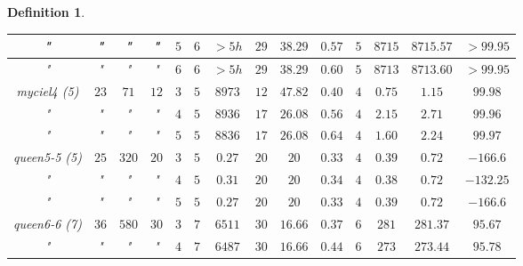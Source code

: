 \documentclass[12pt]{article}
\theoremstyle{slplain}
\newtheorem{defi}{Definition}
\begin{document}
\begin{defi}
\begin{table}[H]
\begin{center}
\begin{tabular}{|c|c|c|c|c|c|c|c|c|c|c|c|c|c|}
\hline
{\small "} & {\small "} & {\small "} & {\small "} & {\small $5$} & {\small $6$} & {\small $>5h$} & {\small $29$}  & {\small $38.29$} & {\small $0.57$}  & {\small $5$} & {\small $8715$} & {\small $8715.57$}  & {\small $>99.95$}\\
\hline
{\small "} & {\small "} & {\small "} & {\small "} & {\small $6$} & {\small $6$} & {\small $>5h$} & {\small $29$}  & {\small $38.29$} & {\small $0.60$} & {\small $5$} & {\small $8713$} & {\small $8713.60$}  & {\small $>99.95$}\\
\hline
\hline
{\small myciel4 (5)} & {\small $23$} & {\small $71$} & {\small $12$} & {\small $3$} & {\small $5$} & {\small $8973$} & {\small $12$}  & {\small $47.82$} & {\small $0.40$} & {\small $4$} & {\small $0.75$} & {\small $1.15$}  & {\small $99.98$}\\
\hline
{\small "} & {\small "} & {\small "} & {\small "} & {\small $4$} & {\small $5$} & {\small $8936$} & {\small $17$}  & {\small $26.08$} & {\small $0.56$} & {\small $4$} & {\small $2.15$} & {\small $2.71$}  & {\small $99.96$}\\
\hline
{\small "} & {\small "} & {\small "} & {\small "} & {\small $5$} & {\small $5$} & {\small $8836$} & {\small $17$}  & {\small $26.08$} & {\small $0.64$} & {\small $4$} & {\small $1.60$} & {\small $2.24$}  & {\small $99.97$}\\
\hline
\hline
{\small queen5-5 (5)} & {\small $25$} & {\small $320$} & {\small $20$} & {\small $3$} & {\small $5$} & {\small $0.27$} & {\small $20$}  & {\small $20$} & {\small $0.33$} & {\small $4$} & {\small $0.39$} & {\small $0.72$}  & {\small $-166.6$}\\
\hline
{\small "} & {\small "} & {\small "} & {\small "} & {\small $4$} & {\small $5$} & {\small $0.31$} & {\small $20$}  & {\small $20$} & {\small $0.34$} & {\small $4$} & {\small $0.38$} & {\small $0.72$}  & {\small $-132.25$}\\
\hline
{\small "} & {\small "} & {\small "} & {\small "} & {\small $5$} & {\small $5$} & {\small $0.27$} & {\small $20$}  & {\small $20$} & {\small $0.33$} & {\small $4$} & {\small $0.39$} & {\small $0.72$}  & {\small $-166.6$}\\
\hline
\hline
{\small queen6-6 (7)} & {\small $36$} & {\small $580$} & {\small $30$} & {\small $3$} & {\small $7$} & {\small $6511$} & {\small $30$}  & {\small $16.66$} & {\small $0.37$} & {\small $6$} & {\small $281$} & {\small $281.37$} & {\small $95.67$}\\
\hline
{\small "} & {\small "} & {\small "} & {\small "} & {\small $4$} & {\small $7$} & {\small $6487$} & {\small $30$}  & {\small $16.66$} & {\small $0.44$} & {\small $6$} & {\small $273$} & {\small $273.44$} & {\small $95.78$}\\

\end{tabular}
\end{center}
\end{table}
\end{defi}
\end{document}
